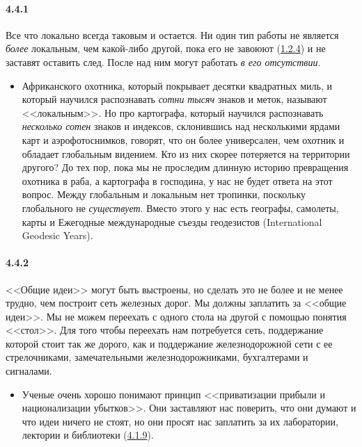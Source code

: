 \paragraph{4.4.1}\hypertarget{par:4.4.1}{} Все что локально всегда таковым и остается. Ни один тип работы не является {\itshape более} локальным, чем какой-либо другой, пока его не завоюют (\hyperlink{par:1.2.4}{1.2.4}) и не заставят оставить след. После над ним могут работать {\itshape в его отсутствии}.
	\begin{itemize}
	\item 
	Африканского охотника, который покрывает десятки квадратных миль, и который научился распознавать {\itshape сотни} {\itshape тысяч} знаков и меток, называют <<локальным>>. Но про картографа, который научился распознавать {\itshape несколько сотен} знаков и индексов, склонившись над несколькими ярдами карт и аэрофотоснимков, говорят, что он более универсален, чем охотник и обладает глобальным видением. Кто из них скорее потеряется на территории другого? До тех пор, пока мы не проследим длинную историю превращения охотника в раба, а картографа в господина, у нас не будет ответа на этот вопрос. Между глобальным и локальным нет тропинки, поскольку глобального не {\itshape существует}. Вместо этого у нас есть географы, самолеты, карты и Ежегодные международные съезды геодезистов (International Geodesic Years).
	\end{itemize}	


\paragraph{4.4.2}\hypertarget{par:4.4.2}{} <<Общие идеи>> могут быть выстроены, но сделать это не более и не менее трудно, чем построит сеть железных дорог. Мы должны заплатить за <<общие идеи>>. Мы не можем переехать с одного стола на другой с помощью понятия <<стол>>. Для того чтобы переехать нам потребуется сеть, поддержание которой стоит так же дорого, как и поддержание железнодорожной сети с ее стрелочниками, замечательными железнодорожниками, бухгалтерами и сигналами. 
	\begin{itemize}
	\item 
	Ученые очень хорошо понимают принцип <<приватизации прибыли и национализации убытков>>. Они заставляют нас поверить, что они думают и что идеи ничего не стоят, но они просят нас заплатить за их лаборатории, лектории и библиотеки (\hyperlink{par:4.1.9}{4.1.9}).
	\end{itemize}	


